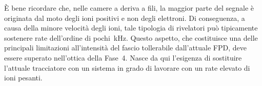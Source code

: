 È bene ricordare che, nelle camere a deriva a fili, la maggior parte del segnale è originata dal moto degli ioni positivi e non degli elettroni.
Di conseguenza, a causa della minore velocità degli ioni, tale tipologia di rivelatori può tipicamente sostenere rate dell'ordine di pochi~kHz. 
Questo aspetto, che costituisce una delle principali limitazioni all'intensità del fascio tollerabile dall'attuale FPD, deve essere superato nell'ottica della Fase~4. 
Nasce da qui l'esigenza di sostituire l'attuale tracciatore con un sistema in grado di lavorare con un rate elevato di ioni pesanti. 


\section{}


\section{}


